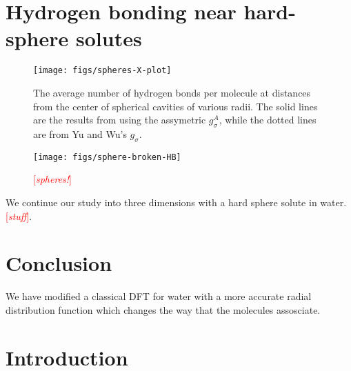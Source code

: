 \documentclass[twocolumn,amsmath,amssymb,prl]{revtex4-1}
\newcommand{\fixme}[1]{\textcolor{red}{[\emph{#1}]}}
\begin{document}
\section{Hydrogen bonding near hard-sphere solutes}

\begin{figure}
\begin{center}
\texttt{[image: figs/spheres-X-plot]}
\end{center}
\caption{ The average number of hydrogen bonds per molecule at
  distances from the center of spherical cavities of various
  radii. The solid lines are the results from using the assymetric
  $g_{\sigma}^A$, while the dotted lines are from Yu and Wu's $g_{\sigma}$.}
\label{fig:spheres-X}
\end{figure}

\begin{figure}
\begin{center}
\texttt{[image: figs/sphere-broken-HB]}
\end{center}
\caption{ \fixme{spheres!}}
\label{fig:spheres-broken-HB}
\end{figure}

We continue our study into three dimensions with a hard sphere solute
in water.\fixme{stuff}.

\section{Conclusion}

We have modified a classical DFT for water with a more accurate radial
distribution function which changes the way that the molecules assosciate.

\clearpage

\section{Introduction}
\end{document}
